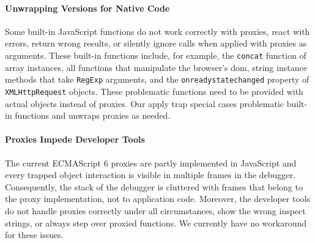 \paragraph{Unwrapping Versions for Native Code} \label{subsec:IMPLEMENTATION:4.3}
Some built-in JavaScript functions do not work correctly with proxies, react with errors, return wrong results, or silently ignore calls when applied with proxies as arguments.
These built-in functions include, for example, the \lstinline{concat} function of array instances, all functions that manipulate the browser's \ac{dom}, string instance methods that take \lstinline{RegExp} arguments, and the \lstinline{onreadystatechanged} property of \lstinline{XMLHttpRequest} objects.
These problematic functions need to be provided with actual objects instead of proxies.
Our apply trap special cases problematic built-in functions and unwraps proxies as needed.

\paragraph{Proxies Impede Developer Tools}
The current ECMAScript 6 proxies are partly implemented in JavaScript and every trapped object interaction is visible in multiple frames in the debugger.
Consequently, the stack of the debugger is cluttered with frames that belong to the proxy implementation, not to application code.
Moreover, the developer tools do not handle proxies correctly under all circumstances, show the wrong inspect strings, or always step over proxied functions.
We currently have no workaround for these issues.



